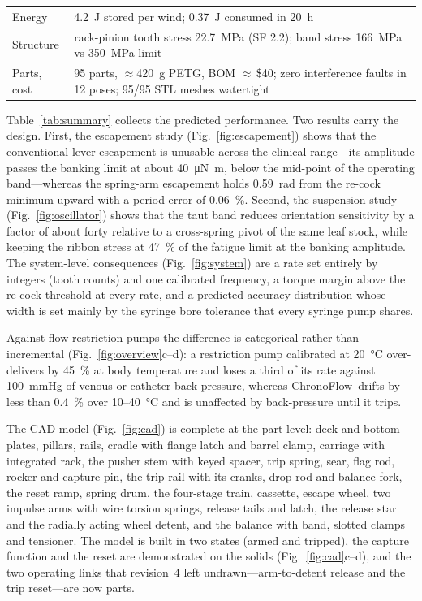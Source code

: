 \documentclass[11pt,a4paper]{article}
\newcommand{\ChronoFlow}{ChronoFlow}
\begin{document}
\begin{table}[t]
\begin{tabular}{@{}p{}p{}@{}}
Energy & \SI{4.2}{\joule} stored per wind; \SI{0.37}{\joule} consumed in \SI{20}{\hour} \\
Structure & rack-pinion tooth stress \SI{22.7}{\mega\pascal} (SF 2.2); band stress \SI{166}{\mega\pascal} vs \SI{350}{\mega\pascal} limit \\
Parts, cost & 95 parts, $\approx$\SI{420}{\gram} PETG, BOM $\approx$\,\$40; zero interference faults in 12 poses; 95/95 STL meshes watertight \\
\bottomrule
\end{tabular}
\end{table}

Table~\ref{tab:summary} collects the predicted performance. Two results carry the design. First, the escapement study (Fig.~\ref{fig:escapement}) shows that the conventional lever escapement is unusable across the clinical range---its amplitude passes the banking limit at about \SI{40}{\micro\newton\metre}, below the mid-point of the operating band---whereas the spring-arm escapement holds \SI{0.59}{\radian} from the re-cock minimum upward with a period error of \SI{0.06}{\percent}. Second, the suspension study (Fig.~\ref{fig:oscillator}) shows that the taut band reduces orientation sensitivity by a factor of about forty relative to a cross-spring pivot of the same leaf stock, while keeping the ribbon stress at \SI{47}{\percent} of the fatigue limit at the banking amplitude. The system-level consequences (Fig.~\ref{fig:system}) are a rate set entirely by integers (tooth counts) and one calibrated frequency, a torque margin above the re-cock threshold at every rate, and a predicted accuracy distribution whose width is set mainly by the syringe bore tolerance that every syringe pump shares.

Against flow-restriction pumps the difference is categorical rather than incremental (Fig.~\ref{fig:overview}c--d): a restriction pump calibrated at \SI{20}{\celsius} over-delivers by \SI{45}{\percent} at body temperature and loses a third of its rate against \SI{100}{mmHg} of venous or catheter back-pressure, whereas \ChronoFlow\ drifts by less than \SI{0.4}{\percent} over 10--\SI{40}{\celsius} and is unaffected by back-pressure until it trips.

The CAD model (Fig.~\ref{fig:cad}) is complete at the part level: deck and bottom plates, pillars, rails, cradle with flange latch and barrel clamp, carriage with integrated rack, the pusher stem with keyed spacer, trip spring, sear, flag rod, rocker and capture pin, the trip rail with its cranks, drop rod and balance fork, the reset ramp, spring drum, the four-stage train, cassette, escape wheel, two impulse arms with wire torsion springs, release tails and latch, the release star and the radially acting wheel detent, and the balance with band, slotted clamps and tensioner. The model is built in two states (armed and tripped), the capture function and the reset are demonstrated on the solids (Fig.~\ref{fig:cad}c--d), and the two operating links that revision~4 left undrawn---arm-to-detent release and the trip reset---are now parts.
\end{document}
